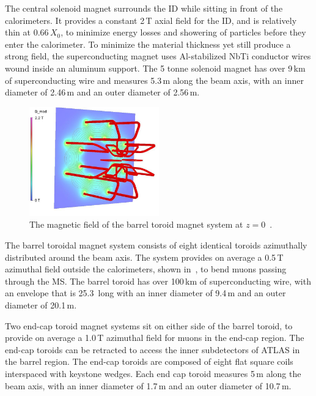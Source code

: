 The central solenoid magnet surrounds the ID while sitting in front of the calorimeters. It provides a constant 2\,T axial field for the ID, and is relatively thin at 0.66\,$X_0$, to minimize energy losses and showering of particles before they enter the calorimeter. To minimize the material thickness yet still produce a strong field, the superconducting magnet uses Al-stabilized NbTi conductor wires wound inside an aluminum support. The 5 tonne solenoid magnet has over 9\,km of superconducting wire and measures 5.3\,m along the beam axis, with an inner diameter of 2.46\,m and an outer diameter of 2.56\,m.

\begin{figure}
\begin{center}
\includegraphics[width=0.5\textwidth]{figures/Atlas/atlas-ma-field}
\end{center}
\caption[Magnetic field of barrel toroid magnet]{The magnetic field of the barrel toroid magnet system at $z=0$~\cite{Atlas_mag}.}
\label{fig:atlas_magfield}
\end{figure}

The barrel toroidal magnet system consists of eight identical toroids azimuthally distributed around the beam axis. The system provides on average a 0.5\,T azimuthal field outside the calorimeters, shown in~\Fig{\ref{fig:atlas_magfield}}, to bend muons passing through the MS. The barrel toroid has over 100\,km of superconducting wire, with an envelope that is 25.3\, long with an inner diameter of 9.4\,m and an outer diameter of 20.1\,m.

Two end-cap toroid magnet systems sit on either side of the barrel toroid, to provide on average a 1.0\,T azimuthal field for muons in the end-cap region. The end-cap toroids can be retracted to access the inner subdetectors of ATLAS in the barrel region. The end-cap toroids are composed of eight flat square coils interspaced with keystone wedges. Each end cap toroid measures 5\,m along the beam axis, with an inner diameter of 1.7\,m and an outer diameter of 10.7\,m. 

